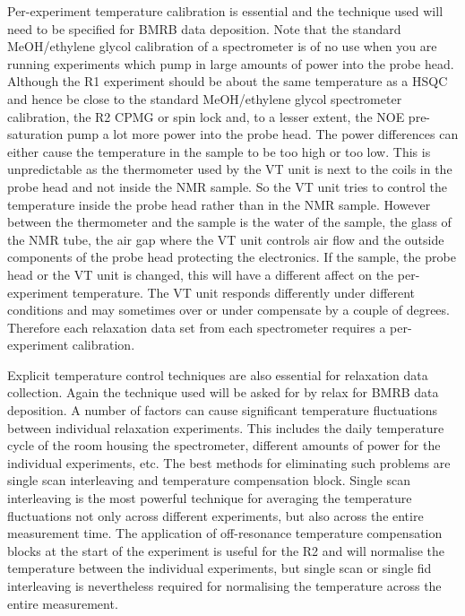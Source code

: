 Per-experiment temperature calibration is essential and the technique used will need to be specified for BMRB data deposition.  Note that the standard MeOH/ethylene glycol calibration of a spectrometer is of no use when you are running experiments which pump in large amounts of power into the probe head.  Although the R1 experiment should be about the same temperature as a HSQC and hence be close to the standard MeOH/ethylene glycol spectrometer calibration, the R2 CPMG or spin lock and, to a lesser extent, the NOE pre-saturation pump a lot more power into the probe head.  The power differences can either cause the temperature in the sample to be too high or too low.  This is unpredictable as the thermometer used by the VT unit is next to the coils in the probe head and not inside the NMR sample.  So the VT unit tries to control the temperature inside the probe head rather than in the NMR sample.  However between the thermometer and the sample is the water of the sample, the glass of the NMR tube, the air gap where the VT unit controls air flow and the outside components of the probe head protecting the electronics.  If the sample, the probe head or the VT unit is changed, this will have a different affect on the per-experiment temperature.  The VT unit responds differently under different conditions and may sometimes over or under compensate by a couple of degrees.  Therefore each relaxation data set from each spectrometer requires a per-experiment calibration.

Explicit temperature control techniques are also essential for relaxation data collection.  Again the technique used will be asked for by relax for BMRB data deposition.  A number of factors can cause significant temperature fluctuations between individual relaxation experiments.  This includes the daily temperature cycle of the room housing the spectrometer, different amounts of power for the individual experiments, etc.  The best methods for eliminating such problems are single scan interleaving and temperature compensation block.  Single scan interleaving is the most powerful technique for averaging the temperature fluctuations not only across different experiments, but also across the entire measurement time.  The application of off-resonance temperature compensation blocks at the start of the experiment is useful for the R2 and will normalise the temperature between the individual experiments, but single scan or single fid interleaving is nevertheless required for normalising the temperature across the entire measurement.


